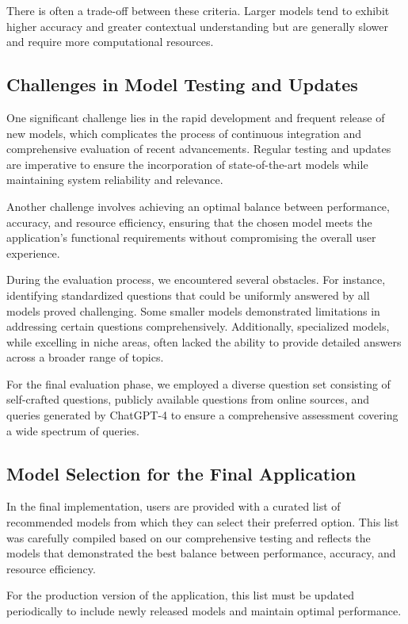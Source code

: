 There is often a trade-off between these criteria. 
Larger models tend to exhibit higher accuracy and greater contextual understanding but are generally slower and 
require more computational resources.

\subsection{Challenges in Model Testing and Updates}

One significant challenge lies in the rapid development and frequent release of new models, 
which complicates the process of continuous integration and comprehensive evaluation of recent advancements. 
Regular testing and updates are imperative to ensure the incorporation of state-of-the-art models while maintaining system reliability and relevance.

Another challenge involves achieving an optimal balance between performance, accuracy, and resource efficiency, 
ensuring that the chosen model meets the application’s functional requirements without compromising the overall user experience.

During the evaluation process, we encountered several obstacles. For instance, 
identifying standardized questions that could be uniformly answered by all models proved challenging. 
Some smaller models demonstrated limitations in addressing certain questions comprehensively. Additionally, 
specialized models, while excelling in niche areas, often lacked the ability to provide detailed answers across a broader range of topics.

For the final evaluation phase, we employed a diverse question set consisting of self-crafted questions, 
publicly available questions from online sources, and queries generated by ChatGPT-4 to ensure a comprehensive assessment covering a wide spectrum of queries.

\subsection{Model Selection for the Final Application}

In the final implementation, users are provided with a curated list of recommended models from which they can select their preferred option. 
This list was carefully compiled based on our comprehensive testing and reflects the models that demonstrated 
the best balance between performance, accuracy, and resource efficiency.

For the production version of the application, 
this list must be updated periodically to include newly released models and maintain optimal performance.

